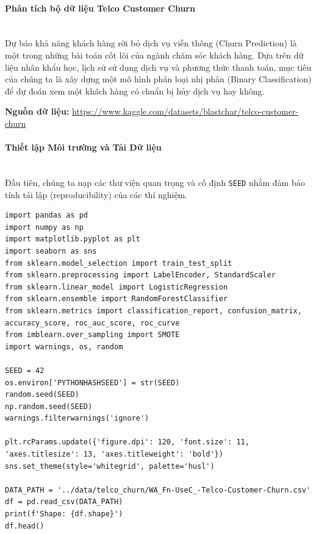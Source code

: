 \paragraph{Phân tích bộ dữ liệu Telco Customer Churn} \hfill \\

Dự báo khả năng khách hàng rời bỏ dịch vụ viễn thông (Churn Prediction) là một trong những bài toán cốt lõi của ngành chăm sóc khách hàng. Dựa trên dữ liệu nhân khẩu học, lịch sử sử dụng dịch vụ và phương thức thanh toán, mục tiêu của chúng ta là xây dựng một mô hình phân loại nhị phân (Binary Classification) để dự đoán xem một khách hàng có chuẩn bị hủy dịch vụ hay không.

\begin{center}
    \textbf{Nguồn dữ liệu:} \url{https://www.kaggle.com/datasets/blastchar/telco-customer-churn}
\end{center}

\paragraph{Thiết lập Môi trường và Tải Dữ liệu} \hfill \\

Đầu tiên, chúng ta nạp các thư viện quan trọng và cố định \texttt{SEED} nhằm đảm bảo tính tái lập (reproducibility) của các thí nghiệm.

\begin{lstlisting}[style=pythoncode, caption={Thiết lập môi trường và tải tập dữ liệu Telco Churn}]
import pandas as pd
import numpy as np
import matplotlib.pyplot as plt
import seaborn as sns
from sklearn.model_selection import train_test_split
from sklearn.preprocessing import LabelEncoder, StandardScaler
from sklearn.linear_model import LogisticRegression
from sklearn.ensemble import RandomForestClassifier
from sklearn.metrics import classification_report, confusion_matrix, accuracy_score, roc_auc_score, roc_curve
from imblearn.over_sampling import SMOTE
import warnings, os, random

SEED = 42
os.environ['PYTHONHASHSEED'] = str(SEED)
random.seed(SEED)
np.random.seed(SEED)
warnings.filterwarnings('ignore')

plt.rcParams.update({'figure.dpi': 120, 'font.size': 11, 'axes.titlesize': 13, 'axes.titleweight': 'bold'})
sns.set_theme(style='whitegrid', palette='husl')

DATA_PATH = '../data/telco_churn/WA_Fn-UseC_-Telco-Customer-Churn.csv'
df = pd.read_csv(DATA_PATH)
print(f'Shape: {df.shape}')
df.head()
\end{lstlisting}

